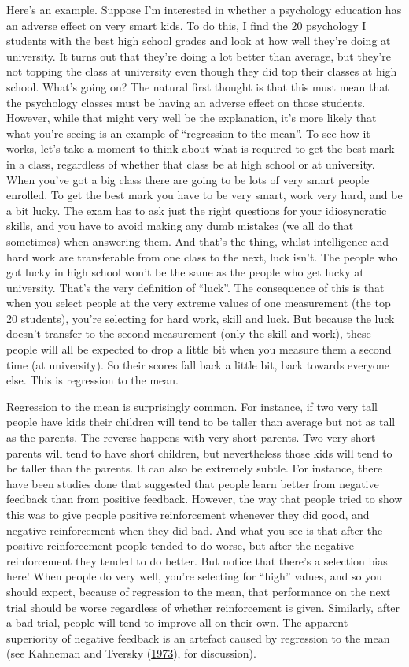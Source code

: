 \documentclass[
]{book}
\begin{document}
Here's an example. Suppose I'm interested in whether a psychology education has an adverse effect on very smart kids. To do this, I find the 20 psychology I students with the best high school grades and look at how well they're doing at university. It turns out that they're doing a lot better than average, but they're not topping the class at university even though they did top their classes at high school. What's going on? The natural first thought is that this must mean that the psychology classes must be having an adverse effect on those students. However, while that might very well be the explanation, it's more likely that what you're seeing is an example of ``regression to the mean''. To see how it works, let's take a moment to think about what is required to get the best mark in a class, regardless of whether that class be at high school or at university. When you've got a big class there are going to be lots of very smart people enrolled. To get the best mark you have to be very smart, work very hard, and be a bit lucky. The exam has to ask just the right questions for your idiosyncratic skills, and you have to avoid making any dumb mistakes (we all do that sometimes) when answering them. And that's the thing, whilst intelligence and hard work are transferable from one class to the next, luck isn't. The people who got lucky in high school won't be the same as the people who get lucky at university. That's the very definition of ``luck''. The consequence of this is that when you select people at the very extreme values of one measurement (the top 20 students), you're selecting for hard work, skill and luck. But because the luck doesn't transfer to the second measurement (only the skill and work), these people will all be expected to drop a little bit when you measure them a second time (at university). So their scores fall back a little bit, back towards everyone else. This is regression to the mean.

Regression to the mean is surprisingly common. For instance, if two very tall people have kids their children will tend to be taller than average but not as tall as the parents. The reverse happens with very short parents. Two very short parents will tend to have short children, but nevertheless those kids will tend to be taller than the parents. It can also be extremely subtle. For instance, there have been studies done that suggested that people learn better from negative feedback than from positive feedback. However, the way that people tried to show this was to give people positive reinforcement whenever they did good, and negative reinforcement when they did bad. And what you see is that after the positive reinforcement people tended to do worse, but after the negative reinforcement they tended to do better. But notice that there's a selection bias here! When people do very well, you're selecting for ``high'' values, and so you should expect, because of regression to the mean, that performance on the next trial should be worse regardless of whether reinforcement is given. Similarly, after a bad trial, people will tend to improve all on their own. The apparent superiority of negative feedback is an artefact caused by regression to the mean (see Kahneman and Tversky (\protect\hyperlink{ref-Kahneman1973}{1973}), for discussion).
\end{document}
